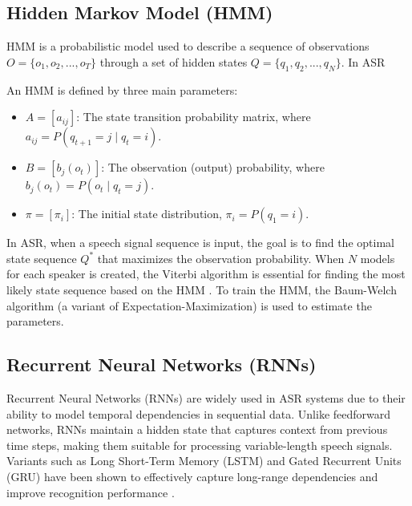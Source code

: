\documentclass[conference]{IEEEtran}
\begin{document}
\subsection{Hidden Markov Model (HMM)}
HMM is a probabilistic model used to describe a sequence of observations $O = \{o_1, o_2, ..., o_T\}$ through a set of hidden states $Q = \{q_1, q_2, ..., q_N\}$. In ASR

An HMM is defined by three main parameters:
\begin{itemize}
    \item $A = [a_{ij}]$: The state transition probability matrix, where $a_{ij} = P(q_{t+1} = j \mid q_t = i)$.
    \item $B = [b_j(o_t)]$: The observation (output) probability, where $b_j(o_t) = P(o_t \mid q_t = j)$.
    \item $\pi = [\pi_i]$: The initial state distribution, $\pi_i = P(q_1 = i)$.
\end{itemize}

In ASR, when a speech signal sequence is input, the goal is to find the optimal state sequence $Q^*$ that maximizes
the observation probability. When \(N\) models for each speaker is created, the Viterbi algorithm is
essential for finding the most likely state sequence based on the HMM \cite{ilyas2007speaker}.
To train the HMM, the Baum-Welch algorithm (a variant of Expectation-Maximization) is used to estimate the parameters.






\subsection{Recurrent Neural Networks (RNNs)}

Recurrent Neural Networks (RNNs) are widely used in ASR systems due to their ability to model temporal dependencies in sequential data. Unlike feedforward networks, RNNs maintain a hidden state that captures context from previous time steps, making them suitable for processing variable-length speech signals. Variants such as Long Short-Term Memory (LSTM) and Gated Recurrent Units (GRU) have been shown to effectively capture long-range dependencies and improve recognition performance \cite{graves2013speech}.
\end{document}
